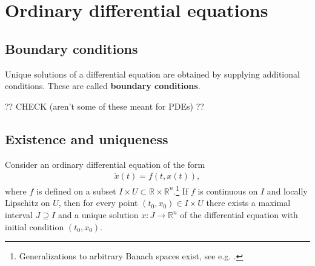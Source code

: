 \chapter{Ordinary differential equations}

\section{Boundary conditions}

    Unique solutions of a differential equation are obtained by supplying additional conditions. These are called \textbf{boundary conditions}.




    ?? CHECK (aren't some of these meant for PDEs) ??

\section{Existence and uniqueness}

    \begin{theorem}\label{diffeq:picard_lindelof}
        Consider an ordinary differential equation of the form
        \begin{gather}
            \dot{x}(t) = f(t,x(t)),
        \end{gather}
        where $f$ is defined on a subset $I\times U\subset\mathbb{R}\times\mathbb{R}^n$.\footnote{Generalizations to arbitrary Banach spaces exist, see e.g. \cite{AMP1}.} If $f$ is continuous on $I$ and locally Lipschitz on $U$, then for every point $(t_0,x_0)\in I\times U$ there exists a maximal interval $J\supseteq I$ and a unique solution $x:J\rightarrow\mathbb{R}^n$ of the differential equation with initial condition $(t_0,x_0)$.
    \end{theorem}

